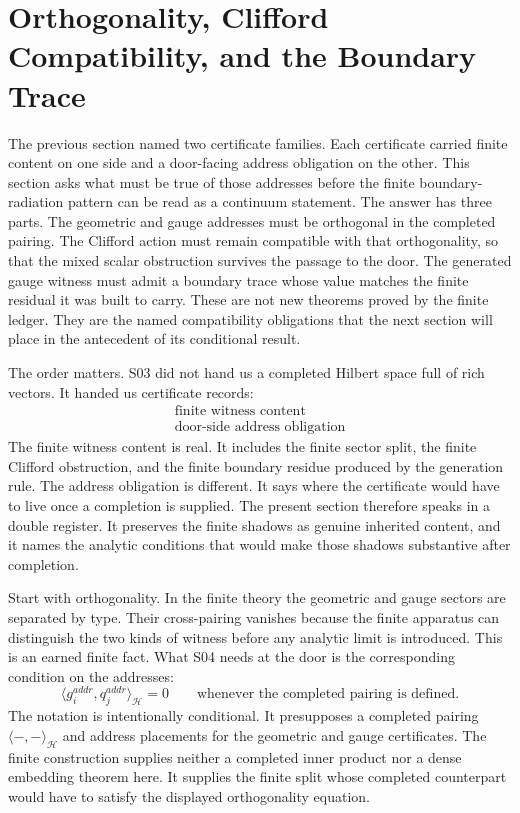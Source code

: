 \section{Orthogonality, Clifford Compatibility, and the Boundary Trace}

The previous section named two certificate families. Each certificate carried
finite content on one side and a door-facing address obligation on the other.
This section asks what must be true of those addresses before the finite
boundary-radiation pattern can be read as a continuum statement. The answer has
three parts. The geometric and gauge addresses must be orthogonal in the
completed pairing. The Clifford action must remain compatible with that
orthogonality, so that the mixed scalar obstruction survives the passage to the
door. The generated gauge witness must admit a boundary trace whose value
matches the finite residual it was built to carry. These are not new theorems
proved by the finite ledger. They are the named compatibility obligations that
the next section will place in the antecedent of its conditional result.

The order matters. S03 did not hand us a completed Hilbert space full of rich
vectors. It handed us certificate records:
\[
  \begin{array}{c}
  \text{finite witness content} \\
  \text{door-side address obligation}
  \end{array}
\]
The finite witness content is real. It includes the finite sector split, the
finite Clifford obstruction, and the finite boundary residue produced by the
generation rule. The address obligation is different. It says where the
certificate would have to live once a completion is supplied. The present
section therefore speaks in a double register. It preserves the finite shadows
as genuine inherited content, and it names the analytic conditions that would
make those shadows substantive after completion.

Start with orthogonality. In the finite theory the geometric and gauge sectors
are separated by type. Their cross-pairing vanishes because the finite
apparatus can distinguish the two kinds of witness before any analytic limit is
introduced. This is an earned finite fact. What S04 needs at the door is the
corresponding condition on the addresses:
\[
  \langle g_i^{addr}, q_j^{addr} \rangle_{\mathcal H} = 0
  \qquad\text{whenever the completed pairing is defined.}
\]
The notation is intentionally conditional. It presupposes a completed pairing
\(\langle -, - \rangle_{\mathcal H}\) and address placements for the
geometric and gauge certificates. The finite construction supplies neither a
completed inner product nor a dense embedding theorem here. It supplies the
finite split whose completed counterpart would have to satisfy the displayed
orthogonality equation.

